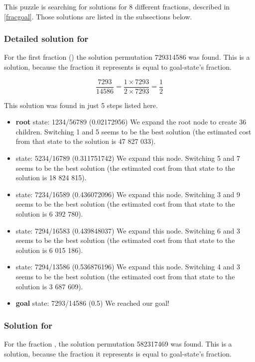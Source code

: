 \documentclass{article}
\begin{document}
This puzzle is searching for solutions for 8 different fractions, described in
\ref{fracgoal}.
Those solutions are listed in the subsections below.

\subsubsection{Detailed solution for }

For the first fraction () the solution permutation 729314586 was
found. This is a solution, because the fraction it represents is equal to
goal-state's fraction.

\[\frac{7293}{14586} = \frac{1 \times 7293}{2 \times 7293} =
\frac{1}{2}\]

This solution was found in just 5 steps listed here.

\begin{itemize}
  \item \textbf{root} state: 1234/56789 (0.02172956)
  We expand the root node to create 36 children.
  Switching 1 and 5 seems to be the best solution (the estimated cost from
  that state to the solution is 47 827 033).
  \item state: 5234/16789 (0.311751742)
  We expand this node.
  Switching 5 and 7 seems to be the best solution (the estimated cost from
  that state to the solution is 18 824 815).
  \item state: 7234/16589 (0.436072096)
  We expand this node.
  Switching 3 and 9 seems to be the best solution (the estimated cost from
  that state to the solution is 6 392 780).
  \item state: 7294/16583 (0.439848037)
  We expand this node.
  Switching 6 and 3 seems to be the best solution (the estimated cost from
  that state to the solution is 6 015 186).
  \item state: 7294/13586 (0.536876196)
  We expand this node.
  Switching 4 and 3 seems to be the best solution (the estimated cost from
  that state to the solution is 3 687 609).
  \item \textbf{goal} state: 7293/14586 (0.5)
  We reached our goal!
\end{itemize}

\subsubsection{Solution for }

For the fraction , the solution permutation 582317469 was
found. This is a solution, because the fraction it represents is equal to
goal-state's fraction.
\end{document}
